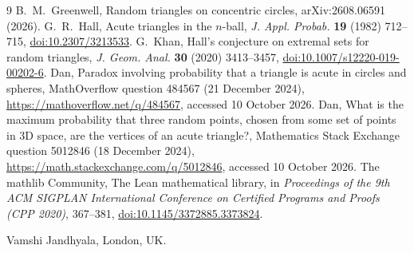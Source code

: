 \documentclass[11pt]{article}
\theoremstyle{remark}
\begin{document}
\begin{thebibliography}{9}
 B.~M.~Greenwell, Random triangles on concentric circles, arXiv:2608.06591 (2026).
 G.~R.~Hall, Acute triangles in the $n$-ball, \emph{J. Appl. Probab.} \textbf{19} (1982)
712--715, \href{https://doi.org/10.2307/3213533}{doi:10.2307/3213533}.
 G.~Khan, Hall's conjecture on extremal sets for random triangles, \emph{J. Geom. Anal.}
\textbf{30} (2020) 3413--3457, \href{https://doi.org/10.1007/s12220-019-00202-6}{doi:10.1007/s12220-019-00202-6}.
 Dan, Paradox involving probability that a triangle is acute in circles and spheres, MathOverflow
question 484567 (21 December 2024), \url{https://mathoverflow.net/q/484567}, accessed 10 October 2026.
 Dan, What is the maximum probability that three random points, chosen from some set of points in
3D space, are the vertices of an acute triangle?, Mathematics Stack Exchange question 5012846 (18 December 2024),
\url{https://math.stackexchange.com/q/5012846}, accessed 10 October 2026.
 The mathlib Community, The Lean mathematical library, in \emph{Proceedings of the 9th ACM
SIGPLAN International Conference on Certified Programs and Proofs (CPP 2020)}, 367--381,
\href{https://doi.org/10.1145/3372885.3373824}{doi:10.1145/3372885.3373824}.
\end{thebibliography}

\bigskip
\noindent Vamshi Jandhyala, London, UK.
\end{document}
